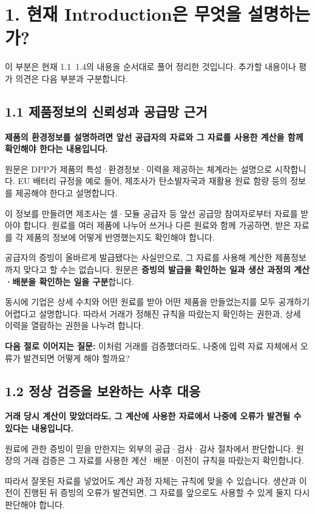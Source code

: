 \section*{1. 현재 Introduction은 무엇을 설명하는가?}
이 부분은 현재 1.1~1.4의 내용을 순서대로 풀어 정리한 것입니다.
추가할 내용이나 평가 의견은 다음 부분과 구분합니다.

\subsection*{1.1 제품정보의 신뢰성과 공급망 근거}
\textbf{제품의 환경정보를 설명하려면 앞선 공급자의 자료와 그 자료를 사용한 계산을 함께 확인해야 한다는 내용입니다.}

원문은 DPP가 제품의 특성·환경정보·이력을 제공하는 체계라는 설명으로 시작합니다.
EU 배터리 규정을 예로 들어, 제조사가 탄소발자국과 재활용 원료 함량 등의 정보를 제공해야 한다고 설명합니다.

이 정보를 만들려면 제조사는 셀·모듈 공급자 등 앞선 공급망 참여자로부터 자료를 받아야 합니다.
원료를 여러 제품에 나누어 쓰거나 다른 원료와 함께 가공하면, 받은 자료를 각 제품의 정보에 어떻게 반영했는지도 확인해야 합니다.

공급자의 증빙이 올바르게 발급됐다는 사실만으로, 그 자료를 사용해 계산한 제품정보까지 맞다고 할 수는 없습니다.
원문은 \textbf{증빙의 발급을 확인하는 일과 생산 과정의 계산·배분을 확인하는 일을 구분}합니다.

동시에 기업은 상세 수치와 어떤 원료를 받아 어떤 제품을 만들었는지를 모두 공개하기 어렵다고 설명합니다.
따라서 거래가 정해진 규칙을 따랐는지 확인하는 권한과, 상세 이력을 열람하는 권한을 나누려 합니다.

\textbf{다음 절로 이어지는 질문:} 이처럼 거래를 검증했더라도, 나중에 입력 자료 자체에서 오류가 발견되면 어떻게 해야 할까요?

\subsection*{1.2 정상 검증을 보완하는 사후 대응}
\textbf{거래 당시 계산이 맞았더라도, 그 계산에 사용한 자료에서 나중에 오류가 발견될 수 있다는 내용입니다.}

원료에 관한 증빙이 믿을 만한지는 외부의 공급·검사·감사 절차에서 판단합니다.
원장의 거래 검증은 그 자료를 사용한 계산·배분·이전이 규칙을 따랐는지 확인합니다.

따라서 잘못된 자료를 넣었어도 계산 과정 자체는 규칙에 맞을 수 있습니다.
생산과 이전이 진행된 뒤 증빙의 오류가 발견되면, 그 자료를 앞으로도 사용할 수 있게 둘지 다시 판단해야 합니다.

